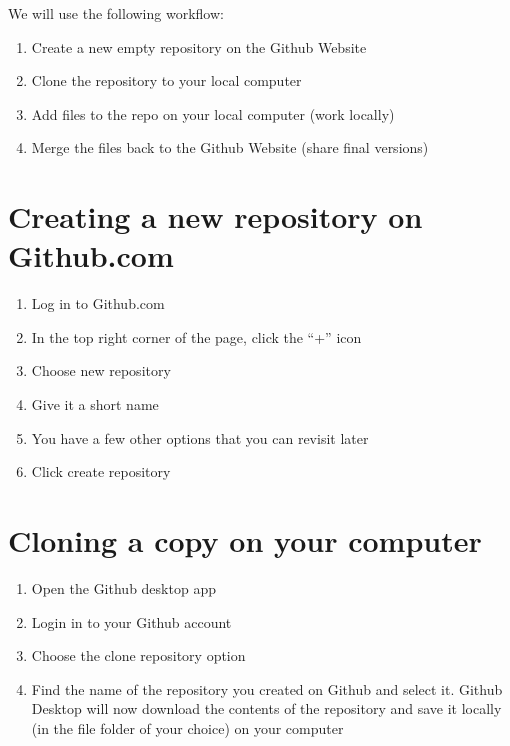 \documentclass[]{book}
\providecommand{\tightlist}{%
  \setlength{\itemsep}{0pt}\setlength{\parskip}{0pt}}
\theoremstyle{definition}
\theoremstyle{definition}
\theoremstyle{definition}
\theoremstyle{remark}
\begin{document}
We will use the following workflow:

\begin{enumerate}
\def\labelenumi{\arabic{enumi}.}
\tightlist
\item
  Create a new empty repository on the Github Website
\item
  Clone the repository to your local computer
\item
  Add files to the repo on your local computer (work locally)
\item
  Merge the files back to the Github Website (share final versions)
\end{enumerate}

\section{Creating a new repository on
Github.com}\label{creating-a-new-repository-on-github.com}

\begin{enumerate}
\def\labelenumi{\arabic{enumi}.}
\tightlist
\item
  Log in to Github.com
\item
  In the top right corner of the page, click the ``+'' icon
\item
  Choose new repository
\item
  Give it a short name
\item
  You have a few other options that you can revisit later
\item
  Click create repository
\end{enumerate}

\section{Cloning a copy on your
computer}\label{cloning-a-copy-on-your-computer}

\begin{enumerate}
\def\labelenumi{\arabic{enumi}.}
\tightlist
\item
  Open the Github desktop app
\item
  Login in to your Github account
\item
  Choose the clone repository option
\item
  Find the name of the repository you created on Github and select it.
  Github Desktop will now download the contents of the repository and
  save it locally (in the file folder of your choice) on your computer
\end{enumerate}
\end{document}

